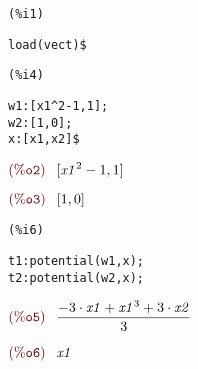 \noindent
\begin{minipage}[t]{8ex}\color{red}\bf
\begin{verbatim}
(%i1) 
\end{verbatim}
\end{minipage}
\begin{minipage}[t]{\textwidth}\color{blue}
\begin{verbatim}
load(vect)$
\end{verbatim}
\end{minipage}


\noindent
\begin{minipage}[t]{8ex}\color{red}\bf
\begin{verbatim}
(%i4) 
\end{verbatim}
\end{minipage}
\begin{minipage}[t]{\textwidth}\color{blue}
\begin{verbatim}
w1:[x1^2-1,1];
w2:[1,0];
x:[x1,x2]$
\end{verbatim}
\end{minipage}

\noindent
$\displaystyle
\parbox{8ex}{$\color{labelcolor}\mathrm{\tt (\%o2) }\quad $}
[{{\mathit{x1}}^{2}}-1,1]$

\noindent
$\displaystyle
\parbox{8ex}{$\color{labelcolor}\mathrm{\tt (\%o3) }\quad $}
[1,0]\mbox{}$


\noindent
\begin{minipage}[t]{8ex}\color{red}\bf
\begin{verbatim}
(%i6) 
\end{verbatim}
\end{minipage}
\begin{minipage}[t]{\textwidth}\color{blue}
\begin{verbatim}
t1:potential(w1,x);
t2:potential(w2,x);
\end{verbatim}
\end{minipage}

\noindent
$\displaystyle
\parbox{8ex}{$\color{labelcolor}\mathrm{\tt (\%o5) }\quad $}
\frac{-3\cdot \mathit{x1}+{{\mathit{x1}}^{3}}+3\cdot \mathit{x2}}{3}$

\noindent
$\displaystyle
\parbox{8ex}{$\color{labelcolor}\mathrm{\tt (\%o6) }\quad $}
\mathit{x1}\mbox{}
$

